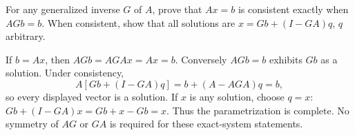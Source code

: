 \begin{problem}\label{ex:10:generalized-solutions}
For any generalized inverse \(G\) of \(A\), prove that \(Ax=b\) is
consistent exactly when \(AGb=b\). When consistent, show that all
solutions are \(x=Gb+(I-GA)q\), \(q\) arbitrary.
\end{problem}
\begin{solution}
If \(b=Ax\), then \(AGb=AGAx=Ax=b\). Conversely \(AGb=b\) exhibits
\(Gb\) as a solution. Under consistency,
\[
A[Gb+(I-GA)q]=b+(A-AGA)q=b,
\]
so every displayed vector is a solution. If \(x\) is any solution,
choose \(q=x\): \(Gb+(I-GA)x=Gb+x-Gb=x\).
Thus the parametrization is complete. No symmetry of \(AG\) or \(GA\)
is required for these exact-system statements.
\end{solution}
